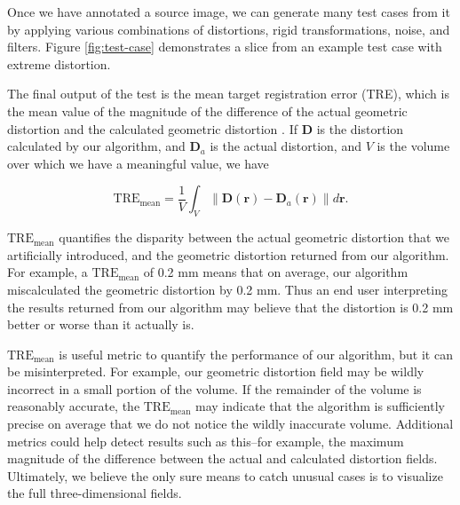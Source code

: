 \documentclass[12pt]{article}
\begin{document}
Once we have annotated a source image, we can generate many test cases from it by applying various combinations of distortions, rigid transformations, noise, and filters.  Figure \ref{fig:test-case} demonstrates a slice from an example test case with extreme distortion.

The final output of the test is the mean target registration error (TRE), which is the mean value of the magnitude of the difference of the actual geometric distortion and the calculated geometric distortion \cite[page R37]{hill2001}.  If $\textbf{D}$ is the distortion calculated by our algorithm, and $\textbf{D}_a$ is the actual distortion, and $V$ is the volume over which we have a meaningful value, we have

$$
\textrm{TRE}_\textrm{mean} = \frac{1}{V}\int_V \| \textbf{D}(\textbf{r}) - \textbf{D}_a(\textbf{r}) \| d\textbf{r}.
$$

$\textrm{TRE}_\textrm{mean}$ quantifies the disparity between the actual geometric distortion that we artificially introduced, and the geometric distortion returned from our algorithm.  For example, a $\textrm{TRE}_\textrm{mean}$ of 0.2 mm means that on average, our algorithm miscalculated the geometric distortion by 0.2 mm.  Thus an end user interpreting the results returned from our algorithm may believe that the distortion is 0.2 mm better or worse than it actually is.

$\textrm{TRE}_\textrm{mean}$ is useful metric to quantify the performance of our algorithm, but it can be misinterpreted.  For example, our geometric distortion field may be wildly incorrect in a small portion of the volume.  If the remainder of the volume is reasonably accurate, the $\textrm{TRE}_\textrm{mean}$ may indicate that the algorithm is sufficiently precise on average that we do not notice the wildly inaccurate volume.  Additional metrics could help detect results such as this--for example, the maximum magnitude of the difference between the actual and calculated distortion fields.  Ultimately, we believe the only sure means to catch unusual cases is to visualize the full three-dimensional fields.
\end{document}
